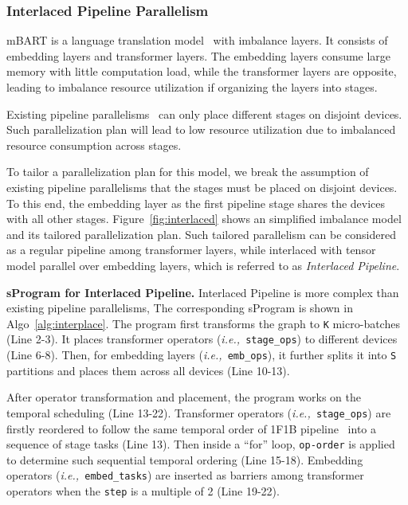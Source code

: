 \subsubsection{Interlaced Pipeline Parallelism}
\label{subsubsec:mbart}

mBART is a language translation model~\cite{mbart} with imbalance layers. It consists of embedding layers and transformer layers. The embedding layers consume large memory with little computation load, while the transformer layers are opposite, leading to imbalance resource utilization if organizing the layers into stages.

Existing pipeline parallelisms~\cite{megatron1,gpipe} can only place different stages on disjoint devices. Such parallelization plan will lead to low resource utilization due to imbalanced resource consumption across stages.

To tailor a parallelization plan for this model, we break the assumption of existing pipeline parallelisms that the stages must be placed on disjoint devices. To this end, the embedding layer as the first pipeline stage shares the devices with all other stages. Figure~\ref{fig:interlaced} shows an simplified imbalance model and its tailored parallelization plan. Such tailored parallelism can be considered as a regular pipeline among transformer layers, while interlaced with tensor model parallel over embedding layers, which is referred to as \emph{Interlaced Pipeline}.

{\bf  {sProgram} for Interlaced Pipeline. } Interlaced Pipeline is more complex than existing pipeline parallelisms, The corresponding {sProgram} is shown in Algo~\ref{alg:interplace}.
The program first transforms the graph to \texttt{K} micro-batches (Line 2-3). It places transformer operators ({\it i.e.,\ }\texttt{stage\_ops}) to different devices (Line 6-8). Then, for embedding layers ({\it i.e.,\ }\texttt{emb\_ops}), it further splits it into \texttt{S} partitions and places them across all devices (Line 10-13).

After operator transformation and placement, the program works on the temporal scheduling (Line 13-22). Transformer operators ({\it i.e.,\ }\texttt{stage\_ops}) are firstly reordered to follow the same temporal order of 1F1B pipeline~\cite{dapple} into a sequence of stage tasks (Line 13). Then inside a ``for'' loop, \texttt{op-order} is applied to determine such sequential temporal ordering (Line 15-18). Embedding operators ({\it i.e.,\ }\texttt{embed\_tasks}) are inserted as barriers among transformer operators when the \texttt{step} is a multiple of 2 (Line 19-22).

